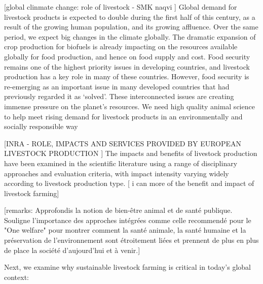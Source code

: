 [global clinmate change: role of livestock - SMK naqvi  ]
Global demand for livestock products
is expected to double during the first half of this century,
as a result of the growing human population, and its
growing affluence. Over the same period, we expect big
changes in the climate globally. The dramatic expansion
of crop production for biofuels is already impacting on the
resources available globally for food production, and
hence on food supply and cost. Food security remains one
of the highest priority issues in developing countries, and
livestock production has a key role in many of these
countries. However, food security is re-emerging as an
important issue in many developed countries that had
previously regarded it as ‘solved’. These interconnected
issues are creating immense pressure on the planet’s
resources. We need high quality animal science to help
meet rising demand for livestock products in an
environmentally and socially responsible way


[INRA - ROLE, IMPACTS AND SERVICES PROVIDED BY EUROPEAN LIVESTOCK PRODUCTION ]
The impacts and benefits of livestock production have been examined
in the scientific literature using a range of disciplinary approaches and
evaluation criteria, with impact intensity varying widely according to
livestock production type. [ i can more of the benefit and impact of livestock farming]


[remarks: Approfondis la notion de bien-être animal et de santé publique.
Souligne l’importance des approches intégrées comme celle recommendé pour le "One welfare" pour montrer comment la santé animale, la santé humaine et la préservation de l’environnement sont étroitement liées et prennent de plus en plus de place la société d'aujourd'hui et à venir.]

Next, we examine why sustainable livestock farming is critical in today’s global context:

